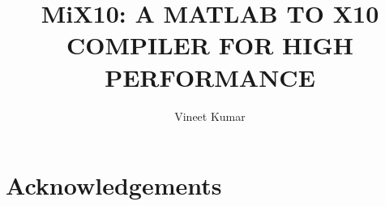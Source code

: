 \documentclass[MSc,twoside,openright]{Thesis}
\title{MiX10: A MATLAB TO X10 COMPILER FOR HIGH PERFORMANCE}
\author{Vineet Kumar}
\newif\ifdraft
\begin{document}
\pagestyle{empty}



\maketitle
\cleardoublepage


\preface %

\begin{Abstract}

\end{Abstract}

\begin{Resume}

\end{Resume}

\chapter*{Acknowledgements}



\renewcommand{\contentsname}{Table of Contents}%
\addto\captionsenglish{%
  \renewcommand{\contentsname}%
    {Table of Contents}%
}
\addto\captionsenglish{%
  \renewcommand{\lstlistlistingname}%
    {List of Listings}%
}

\tableofcontents
\listoffigures
\listoftables
\renewcommand{\lstlistlistingname}{List of Listings}
\cleardoublepage

\maintext %

\pagestyle{fancyplain}


%
%
%
%
\end{document}
